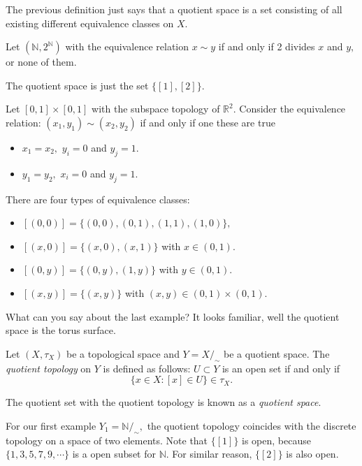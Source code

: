 \documentclass[
	fontsize=10pt, %
	twoside=false, %
	secnumdepth=1, %
]{kaobook}
\begin{document}
The previous definition just says that a quotient space is a set consisting of all existing different equivalence classes on $X.$ 

\begin{example}
Let $(\mathbb{N},2^{\mathbb{N}})$ with the equivalence relation $x\sim y$ if and only if 2 divides $x$ and $y,$ or none of them.

The quotient space is just the set $\{[1],[2]\}.$
\end{example}

\begin{example}
Let $[0,1]\times[0,1]$ with the subspace topology of $\mathbb{R}^2.$ Consider the equivalence relation: $(x_1,y_1)\sim (x_2,y_2)$ if and only if one these are true
\begin{itemize}
\item $x_1=x_2,$  $y_i=0$ and $y_j=1.$
\item $y_1=y_2,$ $x_i=0$ and $y_j=1.$
\end{itemize}

There are four types of equivalence classes: 
\begin{itemize}
\item $[(0,0)]=\{(0,0),(0,1), (1,1),(1,0)\},$
\item $[(x,0)]=\{(x,0),(x,1)\}$ with $x\in(0,1).$
\item $[(0,y)]=\{(0,y),(1,y)\}$ with $y\in (0,1).$
\item $[(x,y)]=\{(x,y)\}$ with $(x,y)\in(0,1)\times(0,1).$
\end{itemize}
\end{example}
 
 What can you say about the last example? It looks familiar, well the quotient space is the torus surface. 
 
 \begin{definition}
 Let $(X,\tau_X)$ be a topological space and $Y=X/_\sim$ be a quotient space. The \emph{quotient topology} on $Y$ is defined as follows: $U\subset Y$ is an open set if and only if $$\{x\in X:[x]\in U\}\in \tau_X.$$
 
 The quotient set with the quotient topology is known as a \emph{quotient space}.
 \end{definition}
 
 \begin{example}
 For our first example $Y_1=\mathbb{N}/_\sim,$ the quotient topology coincides with the discrete topology on a space of two elements. Note that $\{[1]\}$ is open, because $\{1,3,5,7,9,\cdots\}$ is a open subset for $\mathbb{N}.$ For similar reason, $\{[2]\}$ is also open.
 \end{example}
 
\end{document}

